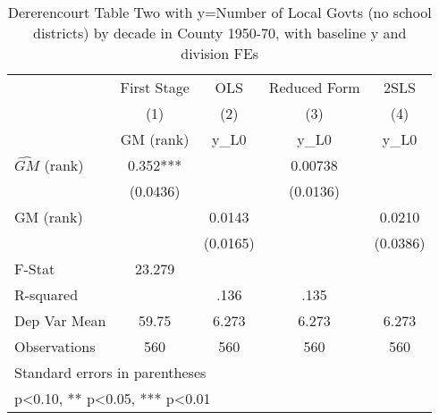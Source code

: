 \begin{table}[htbp]\centering
\def\sym#1{\ifmmode^{#1}\else\(^{#1}\)\fi}
\caption{Dererencourt Table Two with y=Number of Local Govts (no school districts) by decade in County 1950-70, with baseline y and division FEs}
\begin{tabular}{l*{4}{c}}
\toprule
                    & First Stage   &         OLS   &Reduced Form   &        2SLS   \\
                    &\multicolumn{1}{c}{(1)}&\multicolumn{1}{c}{(2)}&\multicolumn{1}{c}{(3)}&\multicolumn{1}{c}{(4)}\\
                    &\multicolumn{1}{c}{GM  (rank)}&\multicolumn{1}{c}{y\_L0}&\multicolumn{1}{c}{y\_L0}&\multicolumn{1}{c}{y\_L0}\\
\midrule
$\hat{GM}$ (rank)   &       0.352***&               &     0.00738   &               \\
                    &    (0.0436)   &               &    (0.0136)   &               \\
\addlinespace
GM  (rank)          &               &      0.0143   &               &      0.0210   \\
                    &               &    (0.0165)   &               &    (0.0386)   \\
\midrule
F-Stat              &      23.279   &               &               &               \\
R-squared           &               &        .136   &        .135   &               \\
Dep Var Mean        &       59.75   &       6.273   &       6.273   &       6.273   \\
Observations        &         560   &         560   &         560   &         560   \\
\bottomrule
\multicolumn{5}{l}{\footnotesize Standard errors in parentheses}\\
\multicolumn{5}{l}{\footnotesize * p<0.10, ** p<0.05, *** p<0.01}\\
\end{tabular}
\end{table}
